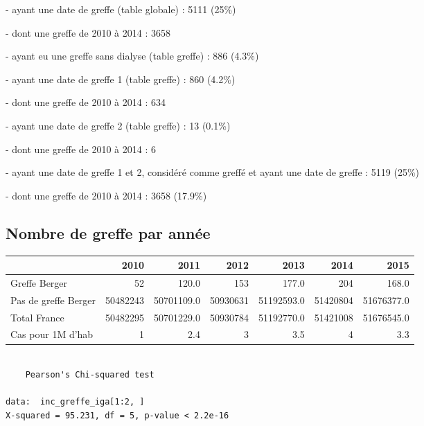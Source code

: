 \documentclass[11pt,a4paper]{article}\usepackage[]{graphicx}\usepackage[]{color}
\makeatletter
\newenvironment{kframe}{%
 \def\at@end@of@kframe{}%
 \ifinner\ifhmode%
  \def\at@end@of@kframe{\end{minipage}}%
  \begin{minipage}{\columnwidth}%
 \fi\fi%
 \def\FrameCommand##1{\hskip\@totalleftmargin \hskip-\fboxsep
 \colorbox{shadecolor}{##1}\hskip-\fboxsep
     \hskip-\linewidth \hskip-\@totalleftmargin \hskip\columnwidth}%
 \MakeFramed {\advance\hsize-\width
   \@totalleftmargin\z@ \linewidth\hsize
   \@setminipage}}%
 {\par\unskip\endMakeFramed%
 \at@end@of@kframe}
\newenvironment{knitrout}{}{} %
\makeatother
\begin{document}
- ayant une date de greffe (table globale) : 5111 (25\%)

\qquad - dont une greffe de 2010 à 2014 : 3658

- ayant eu une greffe sans dialyse (table greffe) : 886 (4.3\%)

- ayant une date de greffe 1 (table greffe) : 860 (4.2\%)

\qquad - dont une greffe de 2010 à 2014 : 634

- ayant une date de greffe 2 (table greffe) : 13 (0.1\%)

\qquad - dont une greffe de 2010 à 2014 : 6

- ayant une date de greffe 1 et 2, considéré comme greffé et ayant une date de greffe : 5119 (25\%)

\qquad - dont une greffe de 2010 à 2014 : 3658 (17.9\%)

  \subsection{Nombre de greffe par année}

\begin{table}[H]
\centering
\begin{tabular}{lrrrrrr}
  \hline
 & 2010 & 2011 & 2012 & 2013 & 2014 & 2015 \\ 
  \hline
Greffe Berger & 52 & 120.0 & 153 & 177.0 & 204 & 168.0 \\ 
  Pas de greffe Berger & 50482243 & 50701109.0 & 50930631 & 51192593.0 & 51420804 & 51676377.0 \\ 
  Total France & 50482295 & 50701229.0 & 50930784 & 51192770.0 & 51421008 & 51676545.0 \\ 
  Cas pour 1M d'hab &  1 & 2.4 &  3 & 3.5 &  4 & 3.3 \\ 
   \hline
\end{tabular}
\end{table}


\begin{knitrout}
\color{fgcolor}\begin{kframe}
\begin{verbatim}

	Pearson's Chi-squared test

data:  inc_greffe_iga[1:2, ]
X-squared = 95.231, df = 5, p-value < 2.2e-16
\end{verbatim}
\end{kframe}
\end{knitrout}
\end{document}
